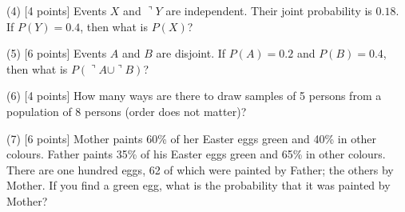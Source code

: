 \documentclass[11pt]{article}
\begin{document}
(4) [4 points] Events $X$ and $\urcorner{}Y$ are independent. Their joint
probability is $0.18$. If $P(Y)=0.4$, then what is $P(X)$?

(5) [6 points] Events $A$ and $B$ are disjoint. If $P(A)=0.2$ and $P(B)=0.4$,
then what is $P(\urcorner{}A\cup\urcorner{}B)$?

(6) [4 points] How many ways are there to draw samples of 5 persons from a
population of 8 persons (order does not matter)?

(7) [6 points] Mother paints 60\% of her Easter eggs green and 40\% in other
colours. Father paints 35\% of his Easter eggs green and 65\% in other
colours. There are one hundred eggs, 62 of which were painted by
Father; the others by Mother. If you find a green egg, what is the
probability that it was painted by Mother?
\end{document}
